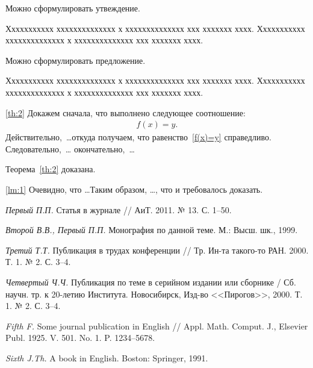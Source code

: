 \documentclass[12pt]{a&t}
\begin{document}
Можно сформулировать утвеждение.

\begin{statement}
Ххххххххххх хххххххххххххх х хххххххххххххх ххх ххххххх хххх.
Ххххххххххх хххххххххххххх х хххххххххххххх ххх ххххххх хххх.
\end{statement}

Можно сформулировать предложение.

\begin{proposition}
Ххххххххххх хххххххххххххх х хххххххххххххх ххх ххххххх хххх.
Ххххххххххх хххххххххххххх х хххххххххххххх ххх ххххххх хххх.
\end{proposition}


\begin{proofoftheorem}{\ref{th:2}}
Докажем сначала, что выполнено следующее соотношение:
\begin{gather} \label{f(x)=y}
    f(x)=y.
\end{gather}
Действительно,~\dots откуда получаем, что
равенство~\eqref{f(x)=y} справедливо. Следовательно,~\dots
окончательно,~\dots

Теорема~\ref{th:2} доказана.
\end{proofoftheorem}

\begin{proofoflemma}{\ref{lm:1}}
Очевидно, что \dots Таким образом, \dots, что и требовалось
доказать.
\end{proofoflemma}


\begin{thebibliography}{10}

{\it Первый П.П.}
Статья в журнале // АиТ. 2011. № 13. С. 1--50.

{\it Второй В.В., Первый П.П.}
Монография по данной теме. М.: Высш. шк., 1999.

{\it Третий Т.Т.}
Публикация в трудах конференции //
Тр. Ин-та такого-то РАН. 2000. Т. 1. № 2. С. 3--4.

{\it Четвертый Ч.Ч.}
Публикация по теме в серийном издании или сборнике /
Сб. научн. тр. к 20-летию Института. Новосибирск, Изд-во <<Пирогов>>, 2000. Т. 1. № 2. С. 3--4.

{\it Fifth F.}
Some journal publication in English //
Appl. Math. Comput. J., Elsevier Publ. 1925. V. 501. No. 1. P. 1234--5678.

{\it Sixth J.Th.}
A book in English. Boston: Springer, 1991.

\end{thebibliography}
\end{document}
